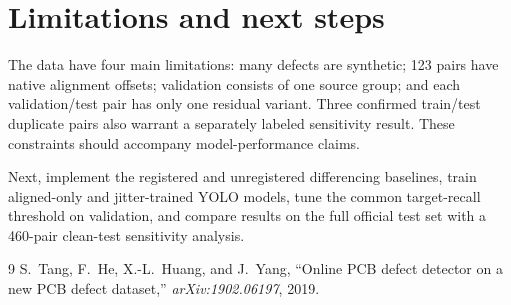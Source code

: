 \documentclass[10pt,a4paper]{article}
\begin{document}
\section{Limitations and next steps}
The data have four main limitations: many defects are synthetic; 123 pairs have native alignment offsets; validation consists of one source group; and each validation/test pair has only one residual variant. Three confirmed train/test duplicate pairs also warrant a separately labeled sensitivity result. These constraints should accompany model-performance claims.

Next, implement the registered and unregistered differencing baselines, train aligned-only and jitter-trained YOLO models, tune the common target-recall threshold on validation, and compare results on the full official test set with a 460-pair clean-test sensitivity analysis.

\begin{thebibliography}{9}
 S.~Tang, F.~He, X.-L.~Huang, and J.~Yang, ``Online PCB defect detector on a new PCB defect
dataset,'' \emph{arXiv:1902.06197}, 2019.
\end{thebibliography}
\end{document}
